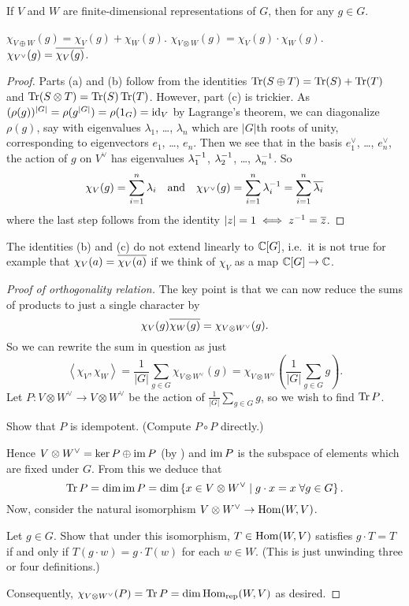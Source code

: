 \begin{theorem}
	If $V$ and $W$ are finite-dimensional representations of $G$,
	then for any $g \in G$.
	\begin{enumerate}[(a)]
		\ii $\chi_{V \oplus W}(g) = \chi_V(g) + \chi_W(g)$.
		\ii $\chi_{V \otimes W}(g) = \chi_V(g) \cdot \chi_W(g)$.
		\ii $\chi_{V^\vee}(g) = \overline{\chi_V(g)}$.
	\end{enumerate}
\end{theorem}
\begin{proof}
	Parts (a) and (b) follow from the identities
	$\operatorname{Tr}(S \oplus T) = \operatorname{Tr}(S) + \operatorname{Tr}(T)$
	and $\operatorname{Tr}(S \otimes T) = \operatorname{Tr}(S) \operatorname{Tr}(T)$.
	However, part (c) is trickier.
	As $(\rho(g))^{|G|} = \rho(g^{|G|}) = \rho(1_G) = \mathrm{id}_V$
	by Lagrange's theorem, we can diagonalize $\rho(g)$,
	say with eigenvalues $\lambda_1$, \dots, $\lambda_n$
	which are $|G|$th roots of unity,
	corresponding to eigenvectors $e_1$, \dots, $e_n$.
	Then we see that in the basis $e_1^\vee$, \dots, $e_n^\vee$,
	the action of $g$ on $V^\vee$ has eigenvalues
	$\lambda_1^{-1}$, $\lambda_2^{-1}$, \dots, $\lambda_n^{-1}$.
	So
	\[
		\chi_V(g) = \sum_{i=1}^n \lambda_i \quad\text{and}\quad
		\chi_{V^\vee}(g) = \sum_{i=1}^n \lambda_i^{-1} = \sum_{i=1}^n \overline{\lambda_i}
	\]
	where the last step follows from the identity $|z|=1 \iff z^{-1} = \overline z$.
\end{proof}
\begin{remark}
	[Warning]
	The identities (b) and (c) do not extend linearly to $\mathbb C[G]$,
	i.e.\ it is not true for example that $\chi_V(a) = \overline{\chi_V(a)}$
	if we think of $\chi_V$ as a map $\mathbb C[G] \to \mathbb C$.
\end{remark}
\begin{proof}
	[Proof of orthogonality relation]
	The key point is that we can now reduce
	the sums of products to just a single character by
	\[ \chi_V(g) \overline{\chi_W(g)} = \chi_{V \otimes W^\vee} (g). \]
	So we can rewrite the sum in question as just
	\[
		\left< \chi_V, \chi_W \right>
		= \frac{1}{|G|} \sum_{g \in G} \chi_{V \otimes W^\vee} (g)
		= \chi_{V \otimes W^\vee}
		\left( \frac{1}{|G|} \sum_{g \in G} g \right).
	\]
	Let $P : V \otimes W^\vee \to V \otimes W^\vee$ be the
	action of $\frac{1}{|G|} \sum_{g \in G} g$,
	so we wish to find $\operatorname{Tr} P$.
	\begin{exercise}
		Show that $P$ is idempotent.
		(Compute $P \circ P$ directly.)
	\end{exercise}
	Hence $V \otimes W^\vee = \ker P \oplus \operatorname{im} P$ (by )
	and $\operatorname{im} P$ is the subspace of elements which are fixed under $G$.
	From this we deduce that
	\[ \operatorname{Tr} P = \dim \operatorname{im} P =
		\dim \left\{ x \in V \otimes W^\vee
		\mid g \cdot x = x \; \forall g \in G  \right\}.
		\]
	Now, consider the natural isomorphism $V \otimes W^\vee \to \operatorname{Hom}(W, V)$.
	\begin{exercise}
		Let $g \in G$.
		Show that under this isomorphism, $T \in \operatorname{Hom}(W, V)$
		satisfies $g \cdot T = T$ if and only if
		$T(g \cdot w) = g \cdot T(w)$ for each $w \in W$.
		(This is just unwinding three or four definitions.)
	\end{exercise}
	Consequently, $\chi_{V \otimes W^\vee}(P) = \operatorname{Tr} P = \dim \operatorname{Hom}_{\mathrm{rep}}(W,V)$
	as desired.
\end{proof}

